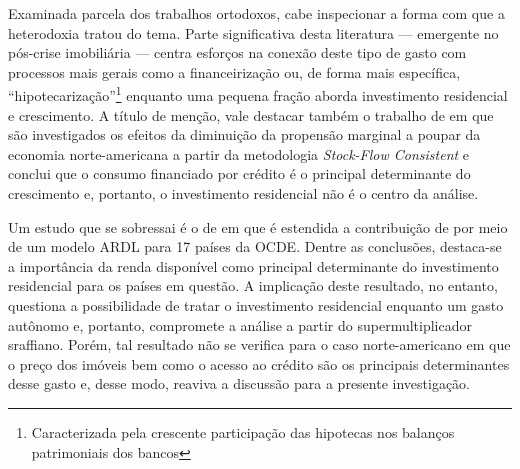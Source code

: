 Examinada parcela dos trabalhos ortodoxos, cabe inspecionar a forma com que a heterodoxia tratou do tema. 
Parte significativa desta literatura  --- emergente no pós-crise imobiliária --- centra esforços na conexão deste tipo de gasto com processos mais gerais como a financeirização \cites{aalbers_financialization_2008}{bibow_financialization_2010} ou, de forma mais específica, ``hipotecarização''\footnote{Caracterizada pela crescente participação das hipotecas nos balanços patrimoniais dos bancos}  \cite{jorda_great_2014} enquanto uma pequena fração aborda investimento residencial e crescimento.
A título de menção, vale destacar também o trabalho de \textcite{zezza_u.s._2008} em que são investigados os efeitos da diminuição da propensão marginal a poupar da economia norte-americana a partir da metodologia \textit{Stock-Flow Consistent} e conclui que o consumo financiado por crédito é o principal determinante do crescimento e, portanto, o investimento residencial não é o centro da análise. 

Um estudo que se sobressai é o de \textcite{arestis_residential_2015} em que é estendida a contribuição de \textcite{poterba_tax_1984} por meio de um modelo ARDL para 17 países da OCDE. Dentre as conclusões, destaca-se a importância da renda disponível como principal determinante do investimento residencial para os países em questão.  A implicação deste resultado, no entanto, questiona a possibilidade de tratar o investimento residencial enquanto um gasto autônomo e, portanto, compromete a análise a partir do supermultiplicador sraffiano. Porém, tal resultado não se verifica para o caso norte-americano em que o preço dos imóveis bem como o acesso ao crédito são os principais determinantes desse gasto e, desse modo, reaviva a discussão para a presente investigação.

